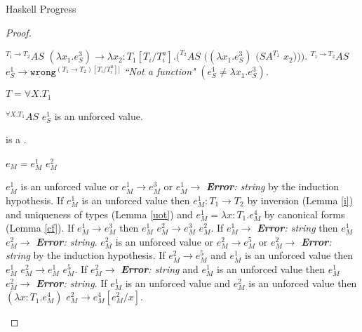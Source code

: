 \begin{theorem}{Haskell Progress}
\begin{proof}
\begin{case}
\begin{subcase}
$^{T_{1}\rightarrow T_{2}}AS$ $(\lambda x_{1}.e_{S}^{3})\rightarrow\lambda x_{2}:T_{1}[T_{i}/T^{a}_{i}].(^{T_{2}}AS$ $((\lambda x_{1}.e_{S}^{3})$ $(SA^{T_{1}}$ $x_{2})))$.  $^{T_{1}\rightarrow T_{2}}AS$ $e_{S}^{1}\rightarrow\mathtt{wrong}^{(T_{1}\rightarrow T_{2})[T_{i}/T_{i}^{a}]]}$ \emph{``Not a function"} $(e_{S}^{1}\neq\lambda x_{1}.e_{S}^{3})$.

\end{subcase}

\begin{subcase}

$T=\forall X.T_{1}$

$^{\forall X.T_{1}}AS$ $e_{S}^{1}$ is an unforced value.

\end{subcase}

\end{case}



\newcommand{\psconsm}{\expcons{\first{\varvalum}}{\second{\varvalum}}\xspace}

\begin{case}

\psconsm

\psconsm is a \profv.

\end{case}


\begin{case}

$e_{M}=e_{M}^{1}$ $e_{M}^{2}$

$e_{M}^{1}$ is an unforced value or $e_{M}^{1}\rightarrow e_{M}^{3}$ or $e_{M}^{1}\rightarrow$ \emph{\textbf{Error}: string} by the induction hypothesis.  If $e_{M}^{1}$ is an unforced value then $e_{M}^{1}:T_{1}\rightarrow T_{2}$ by inversion (Lemma \ref{i}) and uniqueness of types (Lemma \ref{uot}) and $e_{M}^{1}=\lambda x:T_{1}.e_{M}^{4}$ by canonical forms (Lemma \ref{cf}).  If $e_{M}^{1}\rightarrow e_{M}^{3}$ then $e_{M}^{1}$ $e_{M}^{2}\rightarrow e_{M}^{3}$ $e_{M}^{2}$.  If $e_{M}^{1}\rightarrow$ \emph{\textbf{Error}: string} then $e_{M}^{1}$ $e_{M}^{2}\rightarrow$ \emph{\textbf{Error}: string}.  $e_{M}^{2}$ is an unforced value or $e_{M}^{2}\rightarrow e_{M}^{5}$ or $e_{M}^{2}\rightarrow$ \emph{\textbf{Error}: string} by the induction hypothesis.  If $e_{M}^{2}\rightarrow e_{M}^{5}$ and $e_{M}^{1}$ is an unforced value then $e_{M}^{1}$ $e_{M}^{2}\rightarrow e_{M}^{1}$ $e_{M}^{5}$.  If $e_{M}^{2}\rightarrow$ \emph{\textbf{Error}: string} and $e_{M}^{1}$ is an unforced value then $e_{M}^{1}$ $e_{M}^{2}\rightarrow$ \emph{\textbf{Error}: string}.  If $e_{M}^{1}$ is an unforced value and $e_{M}^{2}$ is an unforced value then $(\lambda x:T_{1}.e_{M}^{4})$ $e_{M}^{2}\rightarrow e_{M}^{4}[e_{M}^{2}/x]$.

\end{case}

\end{proof}

\end{theorem}
